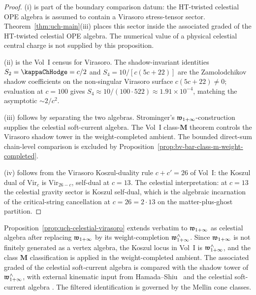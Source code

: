 \begin{proof}
(i) is part of the boundary comparison datum: the HT-twisted celestial
OPE algebra is assumed to contain a Virasoro stress-tensor sector.
Theorem~\ref{thm:uch-main}(iii) places this sector inside the
associated graded of the HT-twisted celestial OPE algebra. The
numerical value of a physical celestial central charge is not supplied
by this proposition.

(ii) is the Vol~I census for Virasoro. The shadow-invariant
identities $S_2 = \kap = c/2$ and $S_4 = 10/[c(5c + 22)]$ are
the Zamolodchikov shadow coefficients on the non-singular Virasoro
surface $c(5c+22)\ne0$; evaluation at $c = 100$ gives
$S_4 \approx 10/(100 \cdot 522) \approx 1.91 \times 10^{-4}$,
matching the asymptotic $\sim 2/c^2$.

(iii) follows by separating the two algebras. Strominger's
\(\mathfrak w_{1+\infty}\)-construction~\cite{StromingerWInfinityCelestial} supplies the
celestial soft-current algebra. The Vol~I class-\(\mathbf M\) theorem
controls the Virasoro shadow tower in the weight-completed ambient.
The bounded direct-sum chain-level comparison is excluded by
Proposition~\ref{prop:bv-bar-class-m-weight-completed}.

(iv) follows from the Virasoro Koszul-duality rule
$c + c' = 26$ of Vol~I: the Koszul dual of
$\mathrm{Vir}_c$ is $\mathrm{Vir}_{26-c}$, self-dual at $c = 13$.
The celestial interpretation: at $c = 13$ the celestial gravity
sector is Koszul self-dual, which is the algebraic incarnation of
the critical-string cancellation at $c = 26 = 2 \cdot 13$ on the
matter-plus-ghost partition.
\end{proof}

\begin{remark}
\label{rem:uch-winfty-celestial}
Proposition~\ref{prop:uch-celestial-virasoro} extends verbatim to
$\mathfrak w_{1+\infty}$ as celestial algebra after replacing $\mathfrak w_{1+\infty}$ by its
weight-completion $\mathfrak w_{1+\infty}^{\wedge}$. Since $\mathfrak w_{1+\infty}$ is not finitely
generated as a vertex algebra, the Koszul locus in Vol~I is
$\mathfrak w_{1+\infty}^{\wedge}$, and the class $\mathbf M$ classification is applied
in the weight-completed ambient. The associated graded of the
celestial soft-current algebra is compared with the shadow tower of
\(\mathfrak w_{1+\infty}^{\wedge}\), with external kinematic input from
Hamada--Shiu~\cite{HamadaShiuSubsubSoft} and the celestial
soft-current algebra
\cite{GuevaraHimwichPateStrominger21,StromingerWInfinityCelestial}.
The filtered identification is governed by the Mellin cone classes.
\end{remark}

